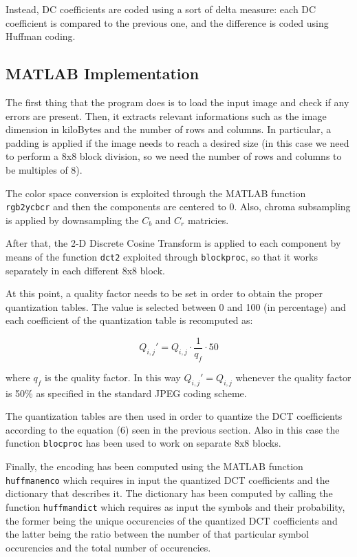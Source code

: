 \documentclass[14pt,a4paper]{extarticle}
\begin{document}
Instead, DC coefficients are coded using a sort of delta measure: each DC coefficient is compared to the previous one, and the difference is coded using Huffman coding.
\\

\subsection{MATLAB Implementation}
The first thing that the program does is to load the input image and check if any errors are present. Then, it extracts relevant informations such as the image dimension in kiloBytes and the number of rows and columns. In particular, a padding is applied if the image needs to reach a desired size (in this case we need to perform a 8x8 block division, so we need the number of rows and columns to be multiples of 8).

The color space conversion is exploited through the MATLAB function \texttt{rgb2ycbcr} and then the components are centered to 0. Also, chroma subsampling is applied by downsampling the $C_b$ and $C_r$ matricies.

After that, the 2-D Discrete Cosine Transform is applied to each component by means of the function \texttt{dct2} exploited through \texttt{blockproc}, so that it works separately in each different 8x8 block.

At this point, a quality factor needs to be set in order to obtain the proper quantization tables. The value is selected between 0 and 100 (in percentage) and each coefficient of the quantization table is recomputed as:

\begin{equation}
Q_{i, j}' = Q_{i, j} \cdot \frac{1}{q_{f}} \cdot 50
\end{equation}

where $q_{f}$ is the quality factor. In this way $Q_{i, j}' = Q_{i, j}$ whenever the quality factor is 50\% as specified in the standard JPEG coding scheme.

The quantization tables are then used in order to quantize the DCT coefficients according to the equation (6) seen in the previous section. Also in this case the function \texttt{blocproc} has been used to work on separate 8x8 blocks.

Finally, the encoding has been computed using the MATLAB function \texttt{huffmanenco} which requires in input the quantized DCT coefficients and the dictionary that describes it. The dictionary has been computed by calling the function \texttt{huffmandict} which requires as input the symbols and their probability, the former being the unique occurencies of the quantized DCT coefficients and the latter being the ratio between the number of that particular symbol occurencies and the total number of occurencies. 
\end{document}
